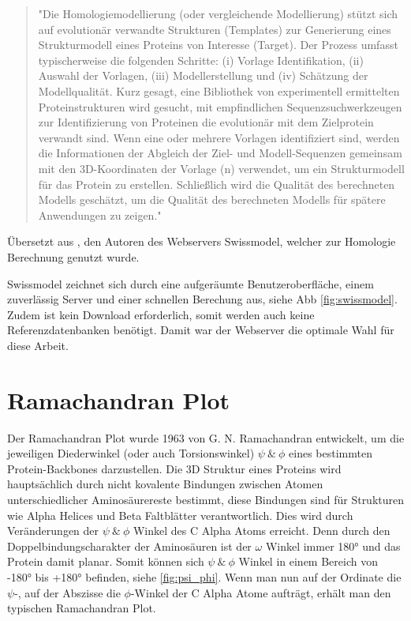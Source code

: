 \begin{quote}
    "Die Homologiemodellierung (oder vergleichende Modellierung) stützt sich auf evolutionär verwandte Strukturen (Templates) zur Generierung eines Strukturmodell eines Proteins von Interesse (Target). Der Prozess umfasst typischerweise die folgenden Schritte: (i) Vorlage Identifikation, (ii) Auswahl der Vorlagen, (iii) Modellerstellung und (iv) Schätzung der Modellqualität. Kurz gesagt, eine Bibliothek von experimentell ermittelten Proteinstrukturen wird gesucht, mit empfindlichen Sequenzsuchwerkzeugen zur Identifizierung von Proteinen die evolutionär mit dem Zielprotein verwandt sind. Wenn eine oder mehrere Vorlagen identifiziert sind, werden die Informationen der Abgleich der Ziel- und Modell-Sequenzen gemeinsam mit den 3D-Koordinaten der Vorlage (n) verwendet, um ein Strukturmodell für das Protein zu erstellen. Schließlich wird die Qualität des berechneten Modells geschätzt, um die Qualität des berechneten Modells für spätere Anwendungen zu zeigen."
\end{quote}

Übersetzt aus \cite{Biasini.2014}, den Autoren des Webservers Swissmodel, welcher zur Homologie Berechnung genutzt wurde. 

Swissmodel zeichnet sich durch eine aufgeräumte Benutzeroberfläche, einem zuverlässig Server und einer schnellen Berechung aus, siehe \ac{Abb} \ref{fig:swissmodel}. Zudem ist kein Download erforderlich, somit werden auch keine Referenzdatenbanken benötigt. Damit war der Webserver die optimale Wahl für diese Arbeit.



\section{Ramachandran Plot}

Der Ramachandran Plot wurde 1963 von G. N. Ramachandran \cite{RAMACHANDRAN.1963} entwickelt, um die jeweiligen Diederwinkel (oder auch Torsionswinkel)  $\psi\ \&\ \phi$ eines bestimmten Protein-Backbones darzustellen. Die 3D Struktur eines Proteins wird hauptsächlich durch nicht kovalente Bindungen zwischen Atomen unterschiedlicher Aminosäurereste bestimmt, diese Bindungen sind für Strukturen wie Alpha Helices und Beta Faltblätter verantwortlich. Dies wird durch Veränderungen der  $\psi\ \&\ \phi$ Winkel des C Alpha Atoms erreicht. Denn durch den Doppelbindungscharakter der Aminosäuren ist der $\omega$ Winkel immer 180° und das Protein damit planar. Somit können sich $\psi\ \&\ \phi$ Winkel in einem Bereich von -180° bis +180° befinden, siehe \ref{fig:psi_phi}. Wenn man nun auf der Ordinate die $\psi$-, auf der Abszisse die $\phi$-Winkel der C Alpha Atome aufträgt, erhält man den typischen Ramachandran Plot. 

